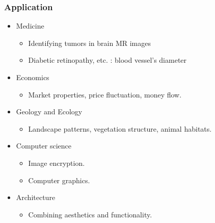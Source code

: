 \begin{frame}
	\frametitle{Application}
	\begin{itemize}
		\item Medicine
		\begin{itemize}
			\item Identifying tumors in brain MR images \cite{iftekharuddin2003fractal}
			\item Diabetic retinopathy, etc. : blood vessel's diameter \cite{uahabi2015applications}
		\end{itemize}
		\item Economics
		\begin{itemize}
			\item Market properties, price fluctuation, money flow. \cite{takayasu2009fractals}
		\end{itemize}
		\item Geology and Ecology
		\begin{itemize}
			\item Landscape patterns, vegetation structure, animal habitats. \cite{LOEHLE1996271}
		\end{itemize}
		\item Computer science
		\begin{itemize}
			\item Image encryption. \cite{sangavi2019image}
			\item Computer graphics. \cite{sala2021fractal}
		\end{itemize}
		\item Architecture
		\begin{itemize}
			\item Combining aesthetics and functionality. \cite{lorenz2002fractals}
		\end{itemize}
	\end{itemize}
\end{frame}